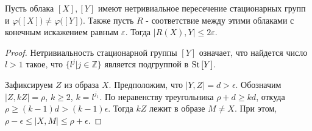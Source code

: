\begin{theorem}
  Пусть облака $[X],[Y]$ имеют нетривиальное пересечение стационарных групп и $\varphi\big([X]\big)\neq \varphi\big([Y]\big)$. Также пусть $ R $ - соответствие между этими облаками с конечным искажением равным $ \varepsilon $. Тогда $ \big|R(X),Y\big| \le 2\varepsilon $.
  
\end{theorem}
\begin{proof}
	Нетривиальность стационарной группы $[Y]$ означает, что найдется
	число $l > 1$ такое, что $\{l^{j}|j\in \mathbb{Z}\}$ является подгруппой в
	$\operatorname{St}{[Y]}$.
	
	Зафиксируем $Z$ из образа $X$.
	Предположим, что $|Y,Z| = d > \epsilon$.  Обозначим
	$|Z, kZ| = \rho$, $k \ge 2$, $k = l^{j_{1}}$. По неравенству треугольника $\rho + d \ge kd$,
	откуда $\rho \ge (k-1)d > (k-1)\epsilon$. Тогда $kZ$ лежит в образе
	$M \ne X$. При этом,
	$\rho - \epsilon \le |X, M| \le \rho + \epsilon$. 
	

\end{proof}
